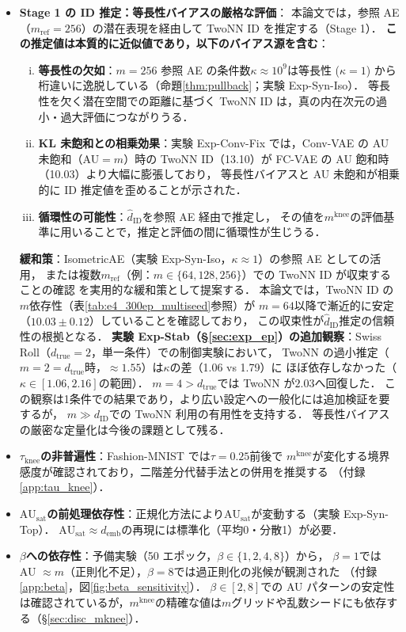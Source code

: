 \documentclass[11pt,a4paper]{jsarticle}
\newcommand{\kap}{\kappa}
\newcommand{\AUsat}{\mathrm{AU}_{\mathrm{sat}}}
\newcommand{\mknee}{m^{\mathrm{knee}}}
\newcommand{\demb}{d_{\mathrm{emb}}}
\begin{document}
\begin{itemize}
  \item \textbf{Stage 1 の ID 推定：等長性バイアスの厳格な評価}：
        本論文では，参照 AE（$m_\mathrm{ref}=256$）の潜在表現を経由して TwoNN ID を推定する（Stage 1）．
        \textbf{この推定値は本質的に近似値であり，以下のバイアス源を含む}：
        \begin{enumerate}[(i)]
          \item \textbf{等長性の欠如}：$m=256$ 参照 AE の条件数$\kap \approx 10^9$は等長性
                ($\kap=1$) から桁違いに逸脱している（命題\ref{thm:pullback}；実験 Exp-Syn-Iso）．
                等長性を欠く潜在空間での距離に基づく TwoNN ID は，真の内在次元の過小・過大評価につながりうる．
          \item \textbf{KL 未飽和との相乗効果}：実験 Exp-Conv-Fix では，Conv-VAE の AU 未飽和（AU$=m$）時の
                TwoNN ID（13.10）が FC-VAE の AU 飽和時（10.03）より大幅に膨張しており，
                等長性バイアスと AU 未飽和が相乗的に ID 推定値を歪めることが示された．
          \item \textbf{循環性の可能性}：$\hat{d}_\mathrm{ID}$を参照 AE 経由で推定し，
                その値を$\mknee$の評価基準に用いることで，推定と評価の間に循環性が生じうる．
        \end{enumerate}
        \textbf{緩和策}：IsometricAE（実験 Exp-Syn-Iso，$\kap \approx 1$）の参照 AE としての活用，
        または複数$m_\mathrm{ref}$（例：$m \in \{64, 128, 256\}$）での TwoNN ID が収束することの確認
        を実用的な緩和策として提案する．
        本論文では，TwoNN ID の$m$依存性（表\ref{tab:e4_300ep_multiseed}参照）が
        $m=64$以降で漸近的に安定（$10.03 \pm 0.12$）していることを確認しており，
        この収束性が$\hat{d}_\mathrm{ID}$推定の信頼性の根拠となる．
        \textbf{実験 Exp-Stab（§\ref{sec:exp_ep}）の追加観察}：Swiss Roll（$d_\mathrm{true}=2$，単一条件）での制御実験において，
        TwoNN の過小推定（$m=2=d_\mathrm{true}$時，$\approx1.55$）は$\kap$の差（1.06 vs 1.79）に
        ほぼ依存しなかった（$\kap \in [1.06, 2.16]$の範囲）．
        $m=4 > d_\mathrm{true}$では TwoNN が$2.03$へ回復した．
        この観察は1条件での結果であり，より広い設定への一般化には追加検証を要するが，
        $m \gg d_\mathrm{ID}$での TwoNN 利用の有用性を支持する．
        等長性バイアスの厳密な定量化は今後の課題として残る．
  \item \textbf{$\tau_{\mathrm{knee}}$の非普遍性}：Fashion-MNIST では$\tau = 0.25$前後で
        $\mknee$が変化する境界感度が確認されており，二階差分代替手法との併用を推奨する
        （付録\ref{app:tau_knee}）．
  \item \textbf{$\AUsat$の前処理依存性}：正規化方法により$\AUsat$が変動する（実験 Exp-Syn-Top）．
        $\AUsat \approx \demb$の再現には標準化（平均0・分散1）が必要．
  \item \textbf{$\beta$への依存性}：予備実験（50 エポック，$\beta \in \{1,2,4,8\}$）から，
        $\beta = 1$では AU $\approx m$（正則化不足），$\beta = 8$では過正則化の兆候が観測された
        （付録\ref{app:beta}，図\ref{fig:beta_sensitivity}）．
        $\beta \in [2, 8]$での AU パターンの安定性は確認されているが，$\mknee$の精確な値は$m$グリッドや乱数シードにも依存する（§\ref{sec:disc_mknee}）．
\end{itemize}
\end{document}

